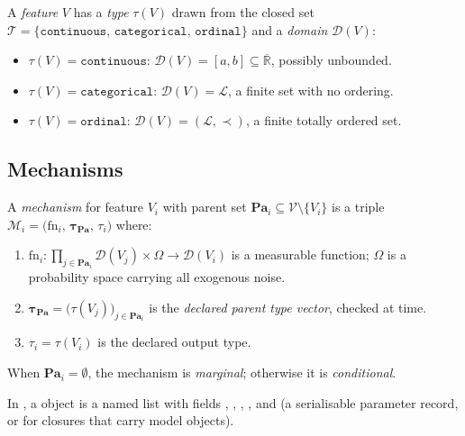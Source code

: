 \documentclass[article]{jss}
\begin{document}
\begin{definition}
\label{def:type}
A \emph{feature} $V$ has a \emph{type} $\tau(V)$ drawn from the closed set
$\mathcal{T} = \{\mathtt{continuous},\, \mathtt{categorical},\, \mathtt{ordinal}\}$
and a \emph{domain} $\mathcal{D}(V)$:
\begin{itemize}[nosep]
  \item $\tau(V) = \mathtt{continuous}$: $\mathcal{D}(V) = [a,b] \subseteq
        \overline{\mathbb{R}}$, possibly unbounded.
  \item $\tau(V) = \mathtt{categorical}$: $\mathcal{D}(V) = \mathcal{L}$, a
        finite set with no ordering.
  \item $\tau(V) = \mathtt{ordinal}$: $\mathcal{D}(V) = (\mathcal{L},\prec)$,
        a finite totally ordered set.
\end{itemize}
\end{definition}

\subsection{Mechanisms}
\label{sec:mech_def}

\begin{definition}[Mechanism]
\label{def:mech}
A \emph{mechanism} for feature $V_i$ with parent set $\mathbf{Pa}_i \subseteq
\mathcal{V}\setminus\{V_i\}$ is a triple
$\mathcal{M}_i = \bigl(\mathrm{fn}_i,\, \boldsymbol\tau_{\mathbf{Pa}},\, \tau_i\bigr)$
where:
\begin{enumerate}[nosep,leftmargin=2em]
  \item $\mathrm{fn}_i : \prod_{j \in \mathbf{Pa}_i}\mathcal{D}(V_j) \times \Omega
        \to \mathcal{D}(V_i)$ is a measurable function; $\Omega$ is a probability
        space carrying all exogenous noise.
  \item $\boldsymbol\tau_{\mathbf{Pa}} = \bigl(\tau(V_j)\bigr)_{j\in\mathbf{Pa}_i}$
        is the \emph{declared parent type vector}, checked at
         time.
  \item $\tau_i = \tau(V_i)$ is the declared output type.
\end{enumerate}
When $\mathbf{Pa}_i = \emptyset$, the mechanism is \emph{marginal}; otherwise it
is \emph{conditional}.
\end{definition}

In , a  object is a named list with fields
, , , , and
 (a serialisable parameter record, or  for closures that
carry model objects).
\end{document}
